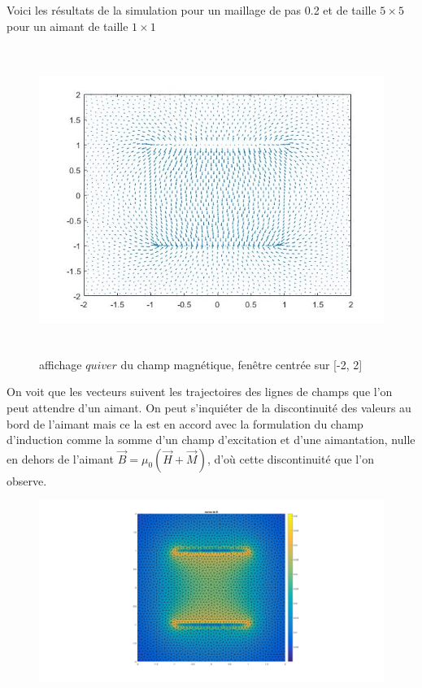 \documentclass[a4paper,12pt,titlepage]{report}
\begin{document}
\begin{onehalfspace}
Voici les résultats de la simulation pour un maillage de pas 0.2 et de taille $5 \times 5$ pour un aimant de taille $1 \times 1$
\begin{figure}[!h]
\begin{center}
\includegraphics[height = 10cm, keepaspectratio]{graphes/resultat_champ.jpg}
\caption{affichage $quiver$ du champ magnétique, fenêtre centrée sur [-2, 2]}
\label{figure 1}
\end{center}
\end{figure}
On voit que les vecteurs suivent les trajectoires des lignes de champs que l'on peut attendre d'un aimant.
On peut s'inquiéter de la discontinuité des valeurs au bord de l'aimant mais ce la est en accord avec la formulation du champ d'induction comme la somme d'un champ d'excitation et d'une aimantation, nulle en dehors de l'aimant $\vec{B}=\mu _{0}(\vec{H}+\vec{M})$, d'où cette discontinuité que l'on observe.
\begin{figure}[!h]
\begin{center}
\includegraphics[height = 8 cm, keepaspectratio]{graphes/norme_du_champ.jpg}

\end{center}
\end{figure}
\end{onehalfspace}
\end{document}
